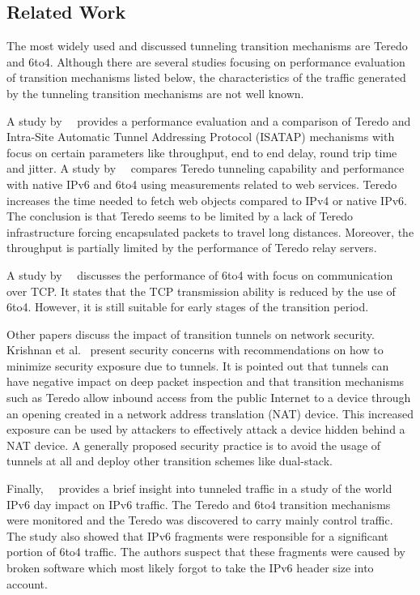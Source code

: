 \subsection{Related Work} \label{subsec:ipv6-tunnels-related-work}

The most widely used and discussed tunneling transition mechanisms are Teredo and 6to4. Although there are several studies focusing on performance evaluation of transition mechanisms listed below, the characteristics of the traffic generated by the tunneling transition mechanisms are not well known.

A study by~\citeauthor{Aazam-2010-Comparison}~\cite{Aazam-2010-Comparison} provides a performance evaluation and a comparison of Teredo and Intra-Site Automatic Tunnel Addressing Protocol (ISATAP) mechanisms with focus on certain parameters like throughput, end to end delay, round trip time and jitter. A study by~\citeauthor{Zander-2012-Investigating}~\cite{Zander-2012-Investigating} compares Teredo tunneling capability and performance with native IPv6 and 6to4 using measurements related to web services. Teredo increases the time needed to fetch web objects compared to IPv4 or native IPv6. The conclusion is that Teredo seems to be limited by a lack of Teredo infrastructure forcing encapsulated packets to travel long distances. Moreover, the throughput is partially limited by the performance of Teredo relay servers.

A study by~\citeauthor{Bahaman-2012-Network}~\cite{Bahaman-2012-Network} discusses the performance of 6to4 with focus on communication over TCP. It states that the TCP transmission ability is reduced by the use of 6to4. However, it is still suitable for early stages of the transition period.

Other papers discuss the impact of transition tunnels on network security. Krishnan et al.~\cite{rfc6169} present security concerns with recommendations on how to minimize security exposure due to tunnels. It is pointed out that tunnels can have negative impact on deep packet inspection and that transition mechanisms such as Teredo allow inbound access from the public Internet to a device through an opening created in a network address translation (NAT) device. This increased exposure can be used by attackers to effectively attack a device hidden behind a NAT device. A generally proposed security practice is to avoid the usage of tunnels at all and deploy other transition schemes like dual-stack.

Finally,~\citeauthor{Sarrar-2012-Investigating}~\cite{Sarrar-2012-Investigating} provides a brief insight into tunneled traffic in a study of the world IPv6 day impact on IPv6 traffic. The Teredo and 6to4 transition mechanisms were monitored and the Teredo was discovered to carry mainly control traffic. The study also showed that IPv6 fragments were responsible for a significant portion of 6to4 traffic. The authors suspect that these fragments were caused by broken software which most likely forgot to take the IPv6 header size into account.

